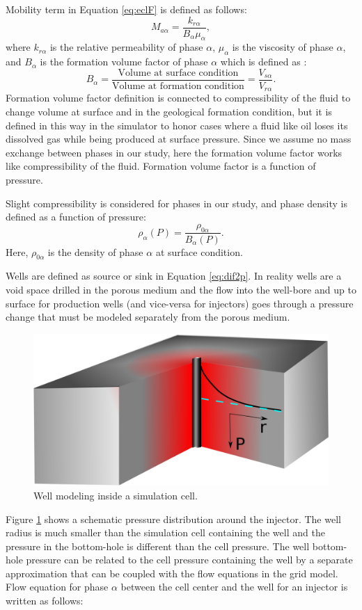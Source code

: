 Mobility term in Equation \ref{eq:eclF} is defined as follows:
\begin{equation}
 M_{a\alpha}=\frac{k_{r\alpha}}{B_\alpha \mu_\alpha},
 \label{eq:mob}
\end{equation} where $k_{r\alpha}$ is the relative permeability of phase
$\alpha$, $\mu_\alpha$ is the viscosity of phase $\alpha$, and $B_\alpha$ is the
formation volume factor of phase $\alpha$ which is defined as :
\begin{equation}
 B_\alpha=\frac{\mbox{Volume at surface condition}}{\mbox{Volume at formation
condition}}=\frac{V_{s\alpha}}{V_{r\alpha}}.  
\end{equation}Formation volume factor definition is connected to compressibility
of the fluid to change volume at surface and in the geological formation
condition, but it is defined in this way in the simulator to honor cases where a
fluid like oil loses its dissolved gas while being produced at surface pressure.
Since we assume no mass exchange between phases in our study, here the formation
volume factor works like compressibility of the fluid. Formation volume factor
is a function of pressure.

Slight compressibility is considered for phases in our study, and phase density
is defined as a function of pressure:
\begin{equation}
 \rho_\alpha(P) =\frac{\rho_{0\alpha}}{B_\alpha(P)}.
 \label{eq:rho}
\end{equation} Here, $\rho_{0\alpha}$ is the density of phase $\alpha$ at
surface condition.

Wells are defined as source or sink in Equation \ref{eq:dif2p}. In reality wells
are a void space drilled in the porous medium and the flow into the
well-bore and up to surface for production wells (and vice-versa for injectors)
goes through a pressure change that must be modeled separately from the porous
medium. 


\begin{figure}
 \centering{}
 \includegraphics[width=0.4\linewidth]{./figurer/WModel.eps}
 \caption{Well modeling inside a simulation cell.}
 \label{fig:WM}
\end{figure}

Figure \ref{fig:WM} shows a schematic pressure distribution around the
injector. The well radius is much smaller than the simulation cell containing
the well and the pressure in the bottom-hole is different than the cell
pressure. The well bottom-hole pressure can be related to the cell pressure
containing the well by a separate approximation that can be coupled with the
flow equations in the grid model. Flow equation for phase $\alpha$ between the
cell center and the well for an injector is written as follows:


